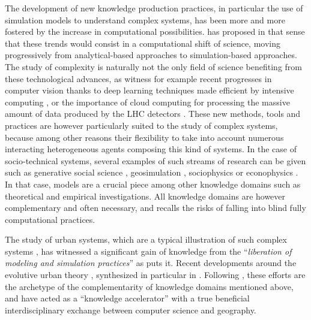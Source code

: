 \documentclass[graybox]{svmult}
\begin{document}
The development of new knowledge production practices, in particular the use of simulation models to understand complex systems, has been more and more fostered by the increase in computational possibilities. \cite{arthur2015complexity} has proposed in that sense that these trends would consist in a computational shift of science, moving progressively from analytical-based approaches to simulation-based approaches. The study of complexity is naturally not the only field of science benefiting from these technological advances, as witness for example recent progresses in computer vision thanks to deep learning techniques made efficient by intensive computing \cite{lecun2015deep}, or the importance of cloud computing for processing the massive amount of data produced by the LHC detectors \cite{bird2011computing}. These new methods, tools and practices are however particularly suited to the study of complex systems, because among other reasons their flexibility to take into account numerous interacting heterogeneous agents composing this kind of systems. In the case of socio-technical systems, several examples of such streams of research can be given such as generative social science \cite{epstein2006generative}, geosimulation \cite{benenson2004geosimulation}, sociophysics \cite{galam2008sociophysics} or econophysics \cite{mantegna1999introduction}. In that case, models are a crucial piece among other knowledge domains \cite{raimbault2017applied} such as theoretical and empirical investigations. All knowledge domains are however complementary and often necessary, and \cite{raimbault2016cautious} recalls the risks of falling into blind fully computational practices.

The study of urban systems, which are a typical illustration of such complex systems \cite{batty2007cities}, has witnessed a significant gain of knowledge from the ``\textit{liberation of modeling and simulation practices}'' as \cite{banos2013pour} puts it. Recent developments around the evolutive urban theory \cite{pumain1997pour}, synthesized in particular in \cite{pumain2017urban}. Following \cite{banos2017knowledge}, these efforts are the archetype of the complementarity of knowledge domains mentioned above, and have acted as a ``knowledge accelerator'' with a true beneficial interdisciplinary exchange between computer science and geography.
\end{document}
